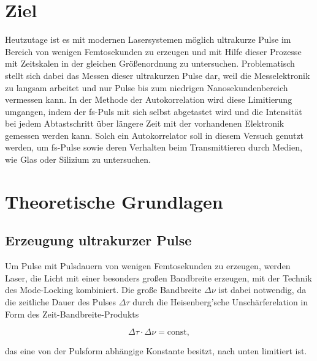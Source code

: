 \section{Ziel}
  Heutzutage ist es mit modernen Lasersystemen möglich ultrakurze Pulse im Bereich von wenigen Femtosekunden zu erzeugen und mit Hilfe dieser Prozesse mit Zeitskalen in der gleichen Größenordnung zu 
  untersuchen. Problematisch stellt sich dabei das Messen dieser ultrakurzen Pulse dar, weil die Messelektronik zu langsam arbeitet und nur Pulse bis zum niedrigen Nanosekundenbereich vermessen kann. In
  der Methode der Autokorrelation wird diese Limitierung umgangen, indem der fs-Puls mit sich selbst abgetastet wird und die Intensität bei jedem Abtastschritt über längere Zeit mit der vorhandenen 
  Elektronik gemessen werden kann. Solch ein Autokorrelator soll in diesem Versuch genutzt werden, um fs-Pulse sowie deren Verhalten beim Transmittieren durch Medien, wie Glas oder Silizium zu untersuchen.
    
\section{Theoretische Grundlagen}

  \subsection{Erzeugung ultrakurzer Pulse}
    Um Pulse mit Pulsdauern von wenigen Femtosekunden zu erzeugen, werden Laser, die Licht mit einer besonders großen Bandbreite erzeugen, mit der Technik des Mode-Locking kombiniert. Die große Bandbreite
    $\Delta\nu$ ist dabei notwendig, da die zeitliche Dauer des Pulses $\Delta\tau$ durch die Heisenberg'sche Unschärferelation in Form des Zeit-Bandbreite-Produkts 
    
    \begin{equation}
      \Delta\tau \cdot \Delta\nu = \text{const},
      \label{eqn:Heisenberg}
    \end{equation}
    
    das eine von der Pulsform abhängige Konstante besitzt, nach unten limitiert ist.    


